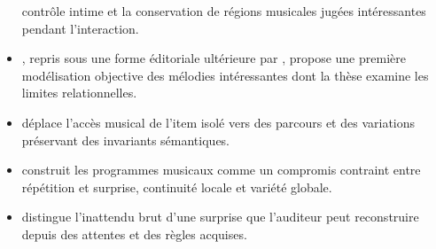 \documentclass[11pt,a4paper]{article}
\begin{document}
\begin{itemize}
        contrôle intime et la conservation de régions musicales jugées
        intéressantes pendant l'interaction.
  \item \textcite{pachet2000melodie}, repris sous une forme éditoriale ultérieure
        par \textcite{pachet2006clefs}, propose une première modélisation objective
        des mélodies intéressantes dont la thèse examine les limites relationnelles.
  \item \textcite{pachet1999active} déplace l'accès musical de l'item isolé vers
        des parcours et des variations préservant des invariants sémantiques.
  \item \textcite{pachet1999programs} construit les programmes musicaux comme un
        compromis contraint entre répétition et surprise, continuité locale et
        variété globale.
  \item \textcite{pachet1999surprising} distingue l'inattendu brut d'une surprise
        que l'auditeur peut reconstruire depuis des attentes et des règles acquises.
\end{itemize}

\printbibliography[keyword={francois-pachet},title={Travaux de François Pachet}]
\printbibliography[notkeyword={francois-pachet},title={Autres références}]
\end{document}
